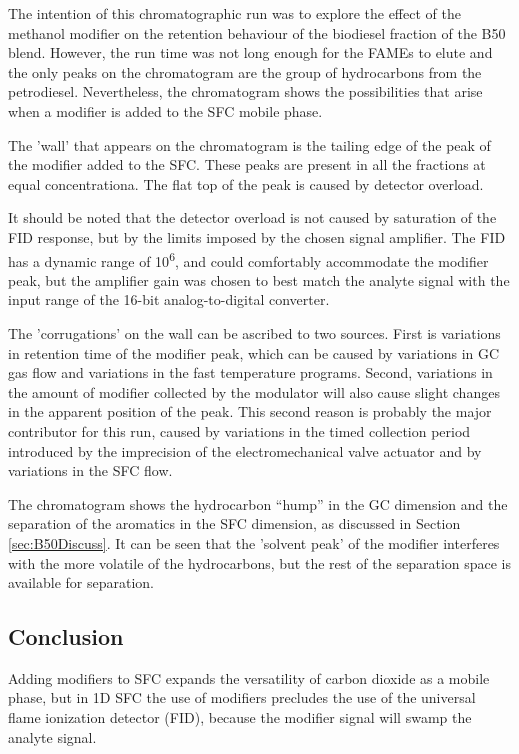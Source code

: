 The intention of this chromatographic run was to explore the effect of the
meth\-anol modifier on the retention behaviour of the biodiesel fraction of the
B50 blend. However, the run time was not long enough for the FAMEs to elute and
the only peaks on the chromatogram are the group of hydrocarbons from the
petrodiesel. Nevertheless, the chromatogram shows the possibilities that arise
when a modifier is added to the SFC mobile phase.

The 'wall' that appears on the chromatogram is the tailing edge of the peak of
the modifier added to the SFC. These peaks are present in all the fractions at
equal concentrationa. The flat top of the peak is caused by detector overload. 

It should be noted that the detector overload is not caused by saturation of the
FID response, but by the limits imposed by the chosen signal amplifier. The FID
has a dynamic range of 10\textsuperscript{6}, and could comfortably accommodate
the modifier peak, but the amplifier gain was chosen to best match the analyte signal
with the input range of the 16-bit analog-to-digital converter.

The 'corrugations' on the wall can be ascribed to two sources. First is
variations in retention time of the modifier peak, which can be caused by
variations in GC gas flow and variations in the fast temperature programs.
Second, variations in the amount of modifier collected by the modulator will
also cause slight changes in the apparent position of the peak. This second
reason is probably the major contributor for this run, caused by variations in
the timed collection period introduced by the imprecision of the
electromechanical valve actuator and by variations in the SFC flow.

The chromatogram shows the hydrocarbon ``hump'' in the GC dimension and the
separation of the aromatics in the SFC dimension, as discussed in Section
\ref{sec:B50Discuss}. It can be seen that the 'solvent peak' of the modifier
interferes with the more volatile of the hydrocarbons, but the rest of the
separation space is available for separation. 

\subsection{Conclusion}

Adding modifiers to SFC expands the versatility of carbon dioxide as a mobile
phase, but in 1D SFC the use of modifiers precludes the use of the universal
flame ionization detector (FID), because the modifier signal will swamp the
analyte signal.

